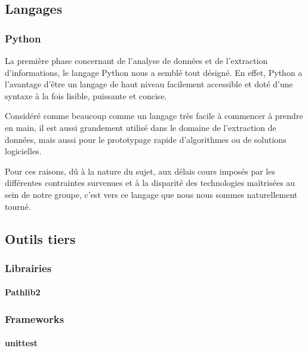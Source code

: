 \documentclass{article}
\begin{document}
\subsection{Langages}\label{subsec:langages}

\subsubsection{Python}

La première phase concernant de l'analyse de données et de l'extraction d'informations, le langage Python nous a semblé tout désigné.
En effet, Python a l'avantage d'être un langage de haut niveau facilement accessible et doté d'une syntaxe à la fois lisible, puissante et concise.

Considéré comme beaucoup comme un langage très facile à commencer à prendre en main, il est aussi grandement utilisé dans le domaine de l'extraction de données, mais aussi pour le prototypage rapide d'algorithmes ou de solutions logicielles.

Pour ces raisons, dû à la nature du sujet, aux délais cours imposés par les différentes contraintes survenues et à la disparité des technologies maîtrisées au sein de notre groupe, c'est vers ce langage que nous nous sommes naturellement tourné.

\subsection{Outils tiers}\label{subsec:outils-tiers}

\subsubsection{Librairies}

\paragraph{Pathlib2}

\subsubsection{Frameworks}

\paragraph{unittest}

\newpage
\end{document}
